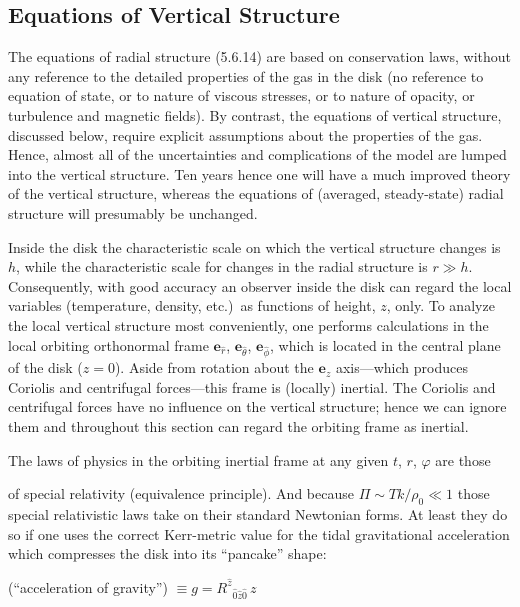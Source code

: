 \subsection{Equations of Vertical Structure}
\label{sec:5.7}

The equations of radial structure (5.6.14) are based on conservation laws,
without any reference to the detailed properties of the gas in the disk (no
reference to equation of state, or to nature of viscous stresses, or to nature
of opacity, or turbulence and magnetic fields).  By contrast, the
equations of vertical structure, discussed below, require explicit assumptions
about the properties of the gas.  Hence, almost all of the uncertainties and
complications of the model are lumped into the vertical structure.  Ten years
hence one will have a much improved theory of the vertical structure, whereas
the equations of (averaged, steady-state) radial structure will presumably be
unchanged.

Inside the disk the characteristic scale on which the vertical structure changes
is $h$, while the characteristic scale for changes in the radial structure is $r \gg h$.
Consequently, with good accuracy an observer inside the disk can regard the
local variables (temperature, density, etc.)\ as functions of height, $z$, only.  To
analyze the local vertical structure most conveniently, one performs calculations
in the local orbiting orthonormal frame $\mathbf{e}_{\hat{r}}$, $\mathbf{e}_{\hat{\theta}}$,
$\mathbf{e}_{\hat{\phi}}$, which is located in the
central plane of the disk ($z = 0$).  Aside from rotation about the $\mathbf{e}_z$ axis---which
produces Coriolis and centrifugal forces---this frame is (locally) inertial.  The
Coriolis and centrifugal forces have no influence on the vertical structure;
hence we can ignore them and throughout this section can regard the orbiting
frame as inertial.

The laws of physics in the orbiting inertial frame at any given $t$, $r$, $\varphi$ are those

of special relativity (equivalence principle).  And because $\Pi \sim Tk/\rho_0 \ll 1$ those
special relativistic laws take on their standard Newtonian forms.  At least they
do so if one uses the correct Kerr-metric value for the tidal gravitational
acceleration which compresses the disk into its ``pancake'' shape:

(``acceleration of gravity'') $\equiv g = R^{\hat{z}}{}_{\hat{0}\hat{z}\hat{0}}\,z$
%
\begin{equation}
\tag{5.7.1}
\end{equation}

